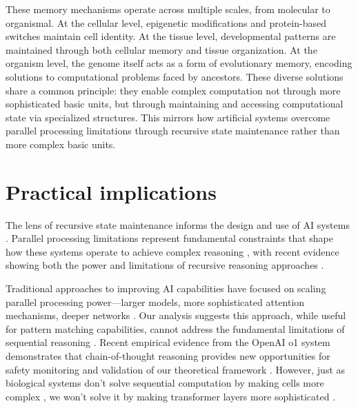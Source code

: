 \documentclass[12pt]{article}
\begin{document}
These memory mechanisms operate across multiple scales, from molecular to organismal.
At the cellular level, epigenetic modifications and protein-based switches maintain cell identity.
At the tissue level, developmental patterns are maintained through both cellular memory and tissue organization.
At the organism level, the genome itself acts as a form of evolutionary memory, encoding solutions to computational problems faced by ancestors.
These diverse solutions share a common principle: they enable complex computation not through more sophisticated basic units, but through maintaining and accessing computational state via specialized structures.
This mirrors how artificial systems overcome parallel processing limitations through recursive state maintenance rather than more complex basic units.

\section{Practical implications}

The lens of recursive state maintenance informs the design and use of AI systems \cite{dickson2024trust,ahn2024recursive,openai2024o1}.
Parallel processing limitations represent fundamental constraints that shape how these systems operate to achieve complex reasoning \cite{merrill2023parallelism}, with recent evidence showing both the power and limitations of recursive reasoning approaches \cite{liu2024mind}.

Traditional approaches to improving AI capabilities have focused on scaling parallel processing power---larger models, more sophisticated attention mechanisms, deeper networks \cite{shallue2019measuring}.
Our analysis suggests this approach, while useful for pattern matching capabilities, cannot address the fundamental limitations of sequential reasoning \cite{peng2024limitations}.
Recent empirical evidence from the OpenAI o1 system demonstrates that chain-of-thought reasoning provides new opportunities for safety monitoring and validation of our theoretical framework \cite{openai2024o1}.
However, just as biological systems don't solve sequential computation by making cells more complex \cite{wang2023parallel}, we won't solve it by making transformer layers more sophisticated \cite{zhao2024epha}.
\end{document}
